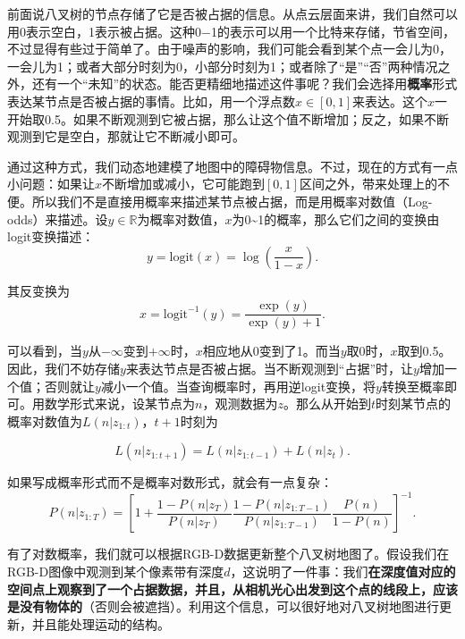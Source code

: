 \newpage
前面说八叉树的节点存储了它是否被占据的信息。从点云层面来讲，我们自然可以用0表示空白，1表示被占据。这种0−1的表示可以用一个比特来存储，节省空间，不过显得有些过于简单了。由于噪声的影响，我们可能会看到某个点一会儿为0，一会儿为1；或者大部分时刻为0，小部分时刻为1；或者除了“是”“否”两种情况之外，还有一个“未知”的状态。能否更精细地描述这件事呢？我们会选择用\textbf{概率}形式表达某节点是否被占据的事情。比如，用一个浮点数$x \in [0,1]$来表达。这个$x$一开始取0.5。如果不断观测到它被占据，那么让这个值不断增加；反之，如果不断观测到它是空白，那就让它不断减小即可。

通过这种方式，我们动态地建模了地图中的障碍物信息。不过，现在的方式有一点小问题：如果让$x$不断增加或减小，它可能跑到$[0,1]$区间之外，带来处理上的不便。所以我们不是直接用概率来描述某节点被占据，而是用概率对数值（Log-odds）来描述。设$y \in \mathbb{R}$为概率对数值，$x$为0\textasciitilde1的概率，那么它们之间的变换由logit变换描述：
\begin{equation}
y = \mathrm{logit}(x) = \log \left( \frac{x}{1-x} \right).
\end{equation}

其反变换为
\begin{equation}
x = \mathrm{logit}^{-1}(y) = \frac{\exp(y)}{\exp(y)+1}.
\end{equation}

\enlargethispage{4pt}
可以看到，当$y$从$-\infty$变到$+\infty$时，$x$相应地从0变到了1。而当$y$取0时，$x$取到0.5。因此，我们不妨存储$y$来表达节点是否被占据。当不断观测到“占据”时，让$y$增加一个值；否则就让$y$减小一个值。当查询概率时，再用逆logit变换，将$y$转换至概率即可。用数学形式来说，设某节点为$n$，观测数据为$z$。那么从开始到$t$时刻某节点的概率对数值为$L(n|z_{1:t})$，$t+1$时刻为

\begin{equation}
L(n|z_{1:t+1}) = L(n|z_{1:t-1}) + L(n|z_{t}).
\end{equation}

如果写成概率形式而不是概率对数形式，就会有一点复杂：
\begin{equation}
P(n|z_{1:T}) =  \left[ 1+ \frac{1-P(n|z_T)}{P(n|z_T)} \frac{1-P(n|z_{1:T-1})}{P(n|z_{1:T-1})} \frac{P(n)}{1-P(n)} \right]^{-1}.
\end{equation}

有了对数概率，我们就可以根据RGB-D数据更新整个八叉树地图了。假设我们在RGB-D图像中观测到某个像素带有深度$d$，这说明了一件事：我们\textbf{在深度值对应的空间点上观察到了一个占据数据，并且，从相机光心出发到这个点的线段上，应该是没有物体的}（否则会被遮挡）。利用这个信息，可以很好地对八叉树地图进行更新，并且能处理运动的结构。

